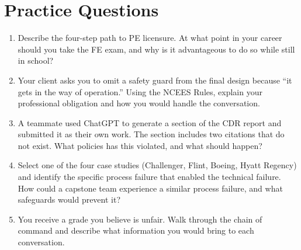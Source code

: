 \section{Practice Questions}
\begin{enumerate}[leftmargin=1.5em]
\item Describe the four-step path to PE licensure. At what point in your career should you take the FE exam, and why is it advantageous to do so while still in school?
\item Your client asks you to omit a safety guard from the final design because ``it gets in the way of operation.'' Using the NCEES Rules, explain your professional obligation and how you would handle the conversation.
\item A teammate used ChatGPT to generate a section of the CDR report and submitted it as their own work. The section includes two citations that do not exist. What policies has this violated, and what should happen?
\item Select one of the four case studies (Challenger, Flint, Boeing, Hyatt Regency) and identify the specific process failure that enabled the technical failure. How could a capstone team experience a similar process failure, and what safeguards would prevent it?
\item You receive a grade you believe is unfair. Walk through the chain of command and describe what information you would bring to each conversation.
\end{enumerate}


